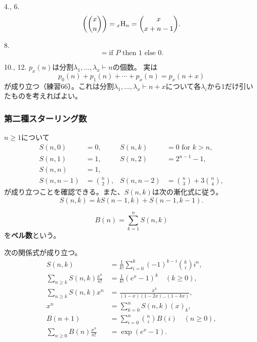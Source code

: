 \documentclass[xelatex,ja=standard,a4paper,14pt,everyparhook=compat]{bxjsarticle}
\newcommand{\bbinom}[2]{\mleft(\binom{#1}{#2}\mright)}
\theoremstyle{definition}
\begin{document}
4., 6. \begin{equation*}
    \bbinom{x}{n} = {}_x \mathrm{H}_n = \binom{x}{x+n-1}.
\end{equation*}

8. \begin{equation*}
    [P] = \text{if $P$ then $1$ else $0$}.
\end{equation*}

10., 12. $p_x(n)$は分割$\lambda_1,\ldots,\lambda_x \vdash n$の個数。
実は \begin{equation*}
    p_0(n) + p_1(n) + \cdots + p_x(n) = p_x(n+x)
\end{equation*}
が成り立つ（練習66）。これは分割$\lambda_1,\ldots,\lambda_x \vdash n+x$について各$\lambda_i$から$1$だけ引いたものを考えればよい。

\subsubsection*{第二種スターリング数}

$n \geq 1$について \begin{align*}
    S(n,0)   & = 0,            & S(n,k)   & = 0 \text{ for $k > n$},        \\
    S(n,1)   & = 1,            & S(n,2)   & = 2^{n-1}-1,                    \\
    S(n,n)   & = 1,                                                         \\
    S(n,n-1) & = \binom{n}{2}, & S(n,n-2) & = \binom{n}{3} + 3\binom{n}{4},
\end{align*}
が成り立つことを確認できる。また、$S(n,k)$は次の漸化式に従う。 \begin{equation*}
    S(n,k) = kS(n-1,k) + S(n-1,k-1).
\end{equation*}

\begin{equation*}
    B(n) = \sum_{k=1}^{n} S(n,k) %
\end{equation*}
を\textbf{ベル数}という。

次の関係式が成り立つ。 \begin{align}
    S(n,k)                                & = \frac{1}{k!} \sum_{i=0}^{k} (-1)^{k-i} \binom{k}{i} i^n, \\
    \sum_{n \geq k} S(n,k) \frac{x^n}{n!} & = \frac{1}{k!} (e^x-1)^k \quad (k \geq 0),                 \\
    \sum_{n \geq k} S(n,k) x^n            & = \frac{x^k}{(1-x)(1-2x)\dots(1-kx)},                      \\
    x^n                                   & = \sum_{k=0}^n S(n,k) (x)_k,                               \\
    B(n+1)                                & = \sum_{i=0}^n \binom{n}{i} B(i) \quad (n \geq 0),         \\
    \sum_{n \geq 0} B(n) \frac{x^n}{n!}   & = \exp(e^x - 1).
\end{align}
\end{document}
